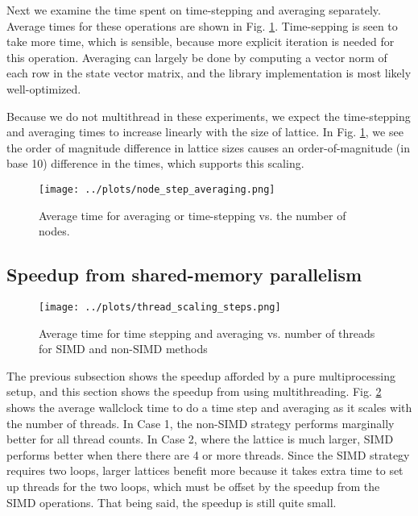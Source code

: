 \documentclass{article}
\begin{document}
Next we examine the time spent on time-stepping and averaging separately. Average times for these operations are shown in 
Fig. \ref{fig:node-average-vs-step}. Time-sepping is seen to take more time, which is sensible, because 
more explicit iteration is needed for this operation. Averaging can largely be done by computing a vector 
norm of each row in the state vector matrix, and the library implementation is most likely well-optimized. 

Because we do not multithread in these experiments, we expect the time-stepping and averaging times to 
increase linearly with the size of lattice. In Fig. \ref{fig:node-average-vs-step}, we see the order of magnitude
difference in lattice sizes causes an order-of-magnitude (in base 10) difference in the times, which 
supports this scaling.

\begin{figure}
    \centering
    \texttt{[image: ../plots/node\_step\_averaging.png]}
    \caption{Average time for averaging or time-stepping vs. the number of nodes.}
    \label{fig:node-average-vs-step}
\end{figure}

\subsection{Speedup from shared-memory parallelism}

\begin{figure}
    \centering
    \texttt{[image: ../plots/thread\_scaling\_steps.png]}
    \caption{Average time for time stepping and averaging vs. number of threads for SIMD and 
    non-SIMD methods}
    \label{fig:threads-avg-step-time}
\end{figure}

The previous subsection shows the speedup afforded by a pure multiprocessing setup, and this section shows the speedup 
from using multithreading. Fig. \ref{fig:threads-avg-step-time} shows the average wallclock time to do a time 
step and averaging as it scales with the number of threads. In Case 1, the non-SIMD strategy performs marginally better 
for all thread counts. In Case 2, where the lattice is much larger, SIMD performs better when there there are 4 or 
more threads. Since the SIMD strategy requires two loops, larger lattices benefit more because it takes extra time
to set up threads for the two loops, which must be offset by the speedup from the SIMD operations. That being said,
the speedup is still quite small.  
\end{document}
